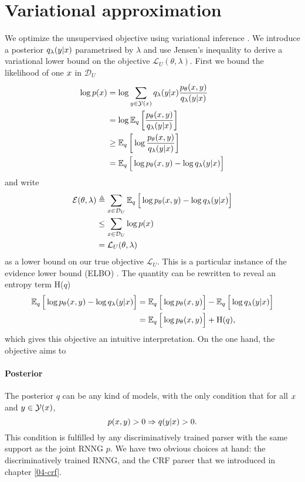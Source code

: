 \section{Variational approximation} We optimize the unsupervised objective using variational inference \citep{Blei+2016:VI}. We introduce a posterior $q_{\lambda}(y | x)$ parametrised by $\lambda$ and use Jensen's inequality to derive a variational lower bound on the objective $\mathcal{L}_U(\theta, \lambda)$. First we bound the likelihood of one $x$ in $\mathcal{D}_U$
\begin{align*}
  \log p (x)
    &= \log \sum_{y  \in \mathcal{Y}(x)} q_{\lambda}(y |x) \frac{p_{\theta}(x,y )}{q_{\lambda}(y | x)} \\
    &= \log \operatorname{\mathbb{E}}_{q} \bigg[\frac{p_{\theta}(x,y )}{ q_{\lambda}(y | x)} \bigg] \\
    &\geq \operatorname{\mathbb{E}}_{q} \bigg[\log \frac{p_{\theta}(x,y )}{q_{\lambda}(y | x)} \bigg] \\
    &= \operatorname{\mathbb{E}}_{q} \Big[\log p_{\theta}(x,y )  - \log q_{\lambda}(y | x) \Big]
  \label{eq:lowerbound}
\end{align*}
and write
\begin{align}
  \operatorname{\mathcal{E}}(\theta, \lambda)
   &\triangleq \sum_{x \in \mathcal{D}_U} \operatorname{\mathbb{E}}_{q} \Big[\log p_{\theta}(x,y )  - \log q_{\lambda}(y | x) \Big] \nonumber \\
   &\leq \sum_{x \in \mathcal{D}_U} \log p (x) \nonumber \\
   &= \mathcal{L}_{U}(\theta, \lambda)
\end{align}
as a lower bound on our true objective $\mathcal{L}_{U}$. This is a particular instance of the evidence lower bound (ELBO) \citep{Blei+2016:VI}. The quantity can be rewritten to reveal an entropy term H($q$)
\begin{align*}
  \operatorname{\mathbb{E}}_{q} \Big[\log p_{\theta}(x,y )  - \log  q_{\lambda}(y | x) \Big]
    &=\operatorname{\mathbb{E}}_{q} \Big[\log p_{\theta}(x,y ) \Big]  - \operatorname{\mathbb{E}}_{q} \Big[\log q_{\lambda}(y | x) \Big] \\
    &= \operatorname{\mathbb{E}}_{q} \Big[\log p_{\theta}(x,y ) \Big]  + \text{H}(q),
  \label{eq:expectation}
\end{align*}
which gives this objective an intuitive interpretation. On the one hand, the objective aims to

\paragraph{Posterior}
The posterior $q$ can be any kind of models, with the only condition that for all $ x $ and $ y \in \mathcal{Y}(x)$,
\begin{equation*}
  p(x, y) > 0 \Rightarrow q( y| x ) > 0.
\end{equation*}
This condition is fulfilled by any discriminatively trained parser with the same support as the joint RNNG $p$. We have two obvious choices at hand: the discriminatively trained RNNG, and the CRF parser that we introduced in chapter \ref{04-crf}.

